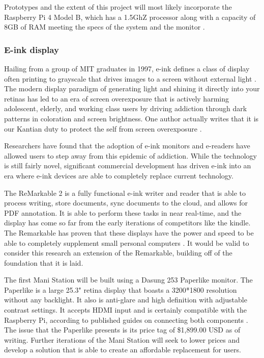 \documentclass[letterpaper,twocolumn,10pt]{article}
\begin{document}
Prototypes and the extent of this project will most likely incorporate the Raspberry Pi 4 Model B, which has a 1.5GhZ processor along with a capacity of 8GB of RAM meeting the specs of the system and the monitor \cite{raspberrypi}.
\subsubsection{E-ink display}
Hailing from a group of MIT graduates in 1997, e-ink defines a class of display often printing to grayscale that drives images to a screen without external light \cite{vail_2018}. The modern display paradigm of generating light and shining it directly into your retinas has led to an era of screen overexposure that is actively harming adolescent, elderly, and working class users by driving addiction through dark patterns in coloration and screen brightness. One author actually writes that it is our Kantian duty to protect the self from screen overexposure \cite{screenaddiction}\cite{multitaskingaddiction}\cite{kantscreens}.

Researchers have found that the adoption of e-ink monitors and e-readers have allowed users to step away from this epidemic of addiction. While the technology is still fairly novel, significant commercial development has driven e-ink into an era where e-ink devices are able to completely replace current technology.\cite{readability}

The ReMarkable 2 is a fully functional e-ink writer and reader that is able to process writing, store documents, sync documents to the cloud, and allows for PDF annotation. It is able to perform these tasks in near real-time, and the display has come so far from the early iterations of competitors like the kindle. The Remarkable has proven that these displays have the power and speed to be able to completely supplement small personal computers \cite{remarkable}. It would be valid to consider this research an extension of the Remarkable, building off of the foundation that it is laid.

The first Mani Station will be built using a Dasung 253 Paperlike monitor. The Paperlike is a large 25.3" retina display that boasts a 3200*1800 resolution without any backlight. It also is anti-glare and high definition with adjustable contrast settings. It accepts HDMI input and is certainly compatible with the Raspberry Pi, according to published guides on connecting both components \cite{monitorconnection}. The issue that the Paperlike presents is its price tag of \$1,899.00 USD as of writing. Further iterations of the Mani Station will seek to lower prices and develop a solution that is able to create an affordable replacement for users.
\end{document}
